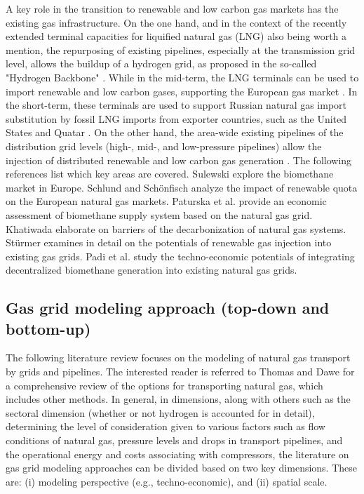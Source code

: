 A key role in the transition to renewable and low carbon gas markets has the existing gas infrastructure. On the one hand, and in the context of the recently extended terminal capacities for liquified natural gas (LNG) also being worth a mention, the repurposing of existing pipelines, especially at the transmission grid level, allows the buildup of a hydrogen grid, as proposed in the so-called "Hydrogen Backbone" \cite{hydrogen_backbone}. While in the mid-term, the LNG terminals can be used to import renewable and low carbon gases, supporting the European gas market \cite{al2022emerging}. In the short-term, these terminals are used to support Russian natural gas import substitution by fossil LNG imports from exporter countries, such as the United States and Quatar \cite{brauers2021liquefied}. On the other hand, the area-wide existing pipelines of the distribution grid levels (high-, mid-, and low-pressure pipelines) allow the injection of distributed renewable and low carbon gas generation \cite{cucchiella2018profitability}. The following references list which key areas are covered. Sulewski \cite{sulewski2023development} explore the biomethane market in Europe. Schlund and Schönfisch \cite{schlund2021analysing} analyze the impact of renewable quota on the European natural gas markets. Paturska et al. \cite{paturska2015economic} provide an economic assessment of biomethane supply system based on the natural gas grid. Khatiwada \cite{khatiwada2022decarbonization} elaborate on barriers of the decarbonization of natural gas systems. Stürmer \cite{sturmer2020greening} examines in detail on the potentials of renewable gas injection into existing gas grids. Padi et al. \cite{padi2023techno} study the techno-economic potentials of integrating decentralized biomethane generation into existing natural gas grids.

\subsection{Gas grid modeling approach (top-down and bottom-up)}\label{approaches}
The following literature review focuses on the modeling of natural gas transport by grids and pipelines. The interested reader is referred to Thomas and Dawe \cite{thomas2003review} for a comprehensive review of the options for transporting natural gas, which includes other methods. In general, in dimensions, along with others such as the sectoral dimension (whether or not hydrogen is accounted for in detail), determining the level of consideration given to various factors such as flow conditions of natural gas, pressure levels and drops in transport pipelines, and the operational energy and costs associating with compressors, the literature on gas grid modeling approaches can be divided based on two key dimensions. These are: (i) modeling perspective (e.g., techno-economic), and (ii) spatial scale.\vspace{0.3cm}


